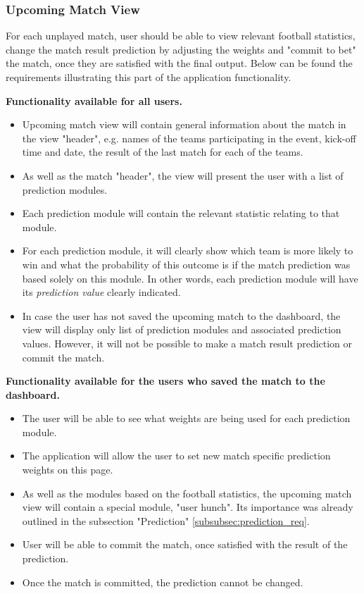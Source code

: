 \subsubsection{Upcoming Match View}
\label{subsubsec:upcomingmatch_req}
For each unplayed match, user should be able to view relevant football statistics, change the match result prediction by adjusting the weights and "commit to bet" the match, once they are satisfied with the final output. Below can be found the requirements illustrating this part of the application functionality.

\textbf{Functionality available for all users.}
\begin{itemize}
	 \item Upcoming match view will contain general information about the match in the view "header", e.g. names of the teams participating in the event, kick-off time and date, the result of the last match for each of the teams.
   \item As well as the match "header", the view will present the user with a list of prediction modules.
   \item Each prediction module will contain the relevant statistic relating to that module.
   \item For each prediction module, it will clearly show which team is more likely to win and what the probability of this outcome is if the match prediction was based solely on this module. In other words, each prediction module will have its \emph{prediction value} clearly indicated.
   \item In case the user has not saved the upcoming match to the dashboard, the view will display only list of prediction modules and associated prediction values. However, it will not be possible to make a match result prediction or commit the match.
  \end{itemize}
 
\textbf{Functionality available for the users who saved the match to the dashboard.}
\begin{itemize}
	\item The user will be able to see what weights are being used for each prediction module.
   \item The application will allow the user to set new match specific prediction weights on this page.
   \item As well as the modules based on the football statistics, the upcoming match view will contain a special module, "user hunch". Its importance was already outlined in the subsection "Prediction" \ref{subsubsec:prediction_req}.
   \item User will be able to commit the match, once satisfied with the result of the prediction.
   \item Once the match is committed, the prediction cannot be changed.
\end{itemize}

